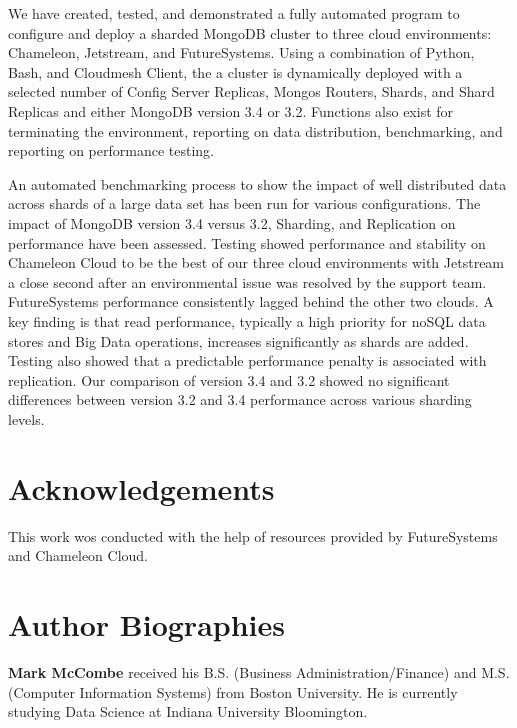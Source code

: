 \documentclass[9pt,twocolumn,twoside]{../../styles/osajnl}
\begin{document}
We have created, tested, and demonstrated a fully automated program to
configure and deploy a sharded MongoDB cluster to three cloud
environments: Chameleon, Jetstream, and FutureSystems. Using a
combination of Python, Bash, and Cloudmesh Client, the a cluster is
dynamically deployed with a selected number of Config Server Replicas,
Mongos Routers, Shards, and Shard Replicas and either MongoDB version
3.4 or 3.2. Functions also exist for terminating the environment,
reporting on data distribution, benchmarking, and reporting on
performance testing.

An automated benchmarking process to show the impact of well
distributed data across shards of a large data set has been run for
various configurations. The impact of MongoDB version 3.4 versus 3.2,
Sharding, and Replication on performance have been assessed. Testing
showed performance and stability on Chameleon Cloud to be the best of
our three cloud environments with Jetstream a close second after an
environmental issue was resolved by the support team. FutureSystems
performance consistently lagged behind the other two clouds. A key
finding is that read performance, typically a high priority for noSQL
data stores and Big Data operations, increases significantly as shards
are added. Testing also showed that a predictable performance penalty
is associated with replication. Our comparison of version 3.4 and 3.2
showed no significant differences between version 3.2 and 3.4
performance across various sharding levels.

\section*{Acknowledgements}

This work wos conducted with the help of resources provided by
FutureSystems and Chameleon Cloud.



 
\section*{Author Biographies}
\begingroup
\setlength\intextsep{0pt}
\begin{minipage}[t][3.2cm][t]{1.0\columnwidth} %
  \noindent
{\bfseries Mark McCombe} received his B.S. (Business Administration/Finance) and M.S. (Computer Information Systems) from Boston University.  He is currently studying Data Science at Indiana University Bloomington.

\end{minipage}
\endgroup
\end{document}
